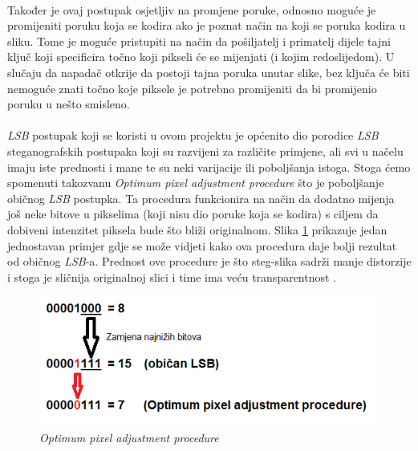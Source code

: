 \documentclass[times, utf8, seminar, numeric]{fer}
\begin{document}
\paragraph{}
Također je ovaj postupak osjetljiv na promjene poruke, odnosno moguće je promijeniti poruku koja se kodira ako je poznat način na koji se poruka kodira u sliku. Tome je moguće pristupiti na način da pošiljatelj i primatelj dijele tajni ključ koji specificira točno koji pikseli će se mijenjati (i kojim redoslijedom). U slučaju da napadač otkrije da postoji tajna poruka unutar slike, bez ključa će biti nemoguće znati točno koje piksele je potrebno promijeniti da bi promijenio poruku u nešto smisleno.
\paragraph{}
\textit{LSB} postupak koji se koristi u ovom projektu je općenito dio porodice \textit{LSB} steganografskih postupaka koji su razvijeni za različite primjene, ali svi u načelu imaju iste prednosti i mane te su neki varijacije ili poboljšanja istoga. Stoga ćemo spomenuti takozvanu \textit{Optimum pixel adjustment procedure} što je poboljšanje običnog \textit{LSB} postupka. Ta procedura funkcionira na način da dodatno mijenja još neke bitove u pikselima (koji nisu dio poruke koja se kodira) s ciljem da dobiveni intenzitet piksela bude što bliži originalnom. Slika \ref{lsb_cmp} prikazuje jedan jednostavan primjer gdje se može vidjeti kako ova procedura daje bolji rezultat od običnog \textit{LSB}-a. Prednost ove procedure je što steg-slika sadrži manje distorzije i stoga je sličnija originalnoj slici i time ima veću transparentnost \cite{ijact_lsb}.
\begin{figure}
\caption{\textit{Optimum pixel adjustment procedure}}
\label{lsb_cmp}
\centerline{\includegraphics[scale=0.8]{images/LSB_cmp.png}}
\end{figure}
\end{document}
